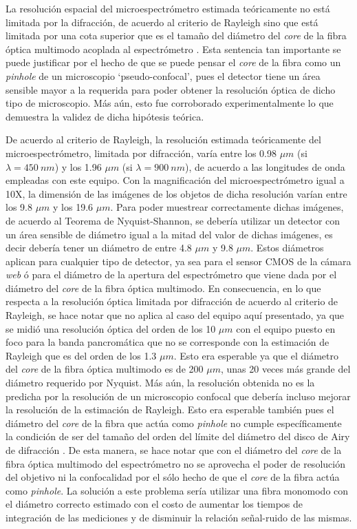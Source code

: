 La resolución espacial del microespectrómetro estimada teóricamente no está limitada por la difracción, de acuerdo al criterio de Rayleigh sino que está limitada por una cota superior que es el tamaño del diámetro del \textit{core} de la fibra óptica multimodo acoplada al espectrómetro \cite{turrell}. Esta sentencia tan importante se puede justificar por el hecho de que se puede pensar el \textit{core} de la fibra como un \textit{pinhole} de un microscopio `pseudo-confocal', pues el detector tiene un área sensible mayor a la requerida para poder obtener la resolución óptica de dicho tipo de microscopio. Más aún, esto fue corroborado experimentalmente lo que demuestra la validez de dicha hipótesis teórica.

De acuerdo al criterio de Rayleigh, la resolución estimada teóricamente del microespectrómetro, limitada por difracción, varía entre los 0.98 $\mu m$ (si $\lambda = 450 ~nm$) y los 1.96 $\mu m$ (si $\lambda = 900 ~nm$), de acuerdo a las longitudes de onda empleadas con este equipo. Con la magnificación del microespectrómetro igual a 10X, la dimensión de las imágenes de los objetos de dicha resolución varían entre los 9.8 $\mu m$ y los 19.6 $\mu m$. Para poder muestrear correctamente dichas imágenes, de acuerdo al Teorema de Nyquist-Shannon, se debería utilizar un detector con un área sensible de diámetro igual a la mitad del valor de dichas imágenes, es decir debería tener un diámetro de entre 4.8 $\mu m$ y 9.8 $\mu m$. Estos diámetros aplican para cualquier tipo de detector, ya sea para el sensor CMOS de la cámara \textit{web} ó para el diámetro de la apertura del espectrómetro que viene dada por el diámetro del \textit{core} de la fibra óptica multimodo. En consecuencia, en lo que respecta a la resolución óptica limitada por difracción de acuerdo al criterio de Rayleigh, se hace notar que no aplica al caso del equipo aquí presentado, ya que se midió una resolución óptica del orden de los 10 $\mu m$ con el equipo puesto en foco para la banda pancromática que no se corresponde con la estimación de Rayleigh que es del orden de los 1.3 $\mu m$. Esto era esperable ya que el diámetro del \textit{core} de la fibra óptica multimodo es de 200 $\mu m$, unas 20 veces más grande del diámetro requerido por Nyquist. Más aún, la resolución obtenida no es la predicha por la resolución de un microscopio confocal que debería incluso mejorar la resolución de la estimación de Rayleigh. Esto era esperable también pues el diámetro del \textit{core} de la fibra que actúa como \textit{pinhole} no cumple específicamente la condición de ser del tamaño del orden del límite del diámetro del disco de Airy de difracción \cite{wilson}. De esta manera, se hace notar que con el diámetro del \textit{core} de la fibra óptica multimodo del espectrómetro no se aprovecha el poder de resolución del objetivo ni la confocalidad por el sólo hecho de que el \textit{core} de la fibra actúa como \textit{pinhole}. La solución a este problema sería utilizar una fibra monomodo con el diámetro correcto estimado con el costo de aumentar los tiempos de integración de las mediciones y de disminuir la relación señal-ruido de las mismas.

